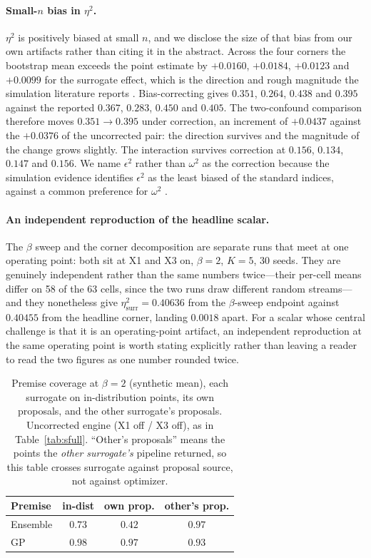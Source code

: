 \documentclass[letterpaper]{article}
\theoremstyle{plain}
\begin{document}
\paragraph{Small-$n$ bias in $\eta^2$.} $\eta^2$ is positively biased at small $n$, and we disclose the size of that bias from our own artifacts rather than citing it in the abstract. Across the four corners the bootstrap mean exceeds the point estimate by $+0.0160$, $+0.0184$, $+0.0123$ and $+0.0099$ for the surrogate effect, which is the direction and rough magnitude the simulation literature reports \citep{okada2013epsilon}. Bias-correcting gives $0.351$, $0.264$, $0.438$ and $0.395$ against the reported $0.367$, $0.283$, $0.450$ and $0.405$. The two-confound comparison therefore moves $0.351\to0.395$ under correction, an increment of $+0.0437$ against the $+0.0376$ of the uncorrected pair: the direction survives and the magnitude of the change grows slightly. The interaction survives correction at $0.156$, $0.134$, $0.147$ and $0.156$. We name $\epsilon^2$ rather than $\omega^2$ as the correction because the simulation evidence identifies $\epsilon^2$ as the least biased of the standard indices, against a common preference for $\omega^2$ \citep{okada2013epsilon}.

\paragraph{An independent reproduction of the headline scalar.} The $\beta$ sweep and the corner decomposition are separate runs that meet at one operating point: both sit at X1 and X3 on, $\beta{=}2$, $K{=}5$, 30 seeds. They are genuinely independent rather than the same numbers twice---their per-cell means differ on 58 of the 63 cells, since the two runs draw different random streams---and they nonetheless give $\eta^2_{\text{surr}}=0.40636$ from the $\beta$-sweep endpoint against $0.40455$ from the headline corner, landing $0.0018$ apart. For a scalar whose central challenge is that it is an operating-point artifact, an independent reproduction at the same operating point is worth stating explicitly rather than leaving a reader to read the two figures as one number rounded twice.

\begin{table}[t]\centering
\caption{Premise coverage at $\beta{=}2$ (synthetic mean), each surrogate on in-distribution points, its own proposals, and the other surrogate's proposals. Uncorrected engine (X1 off / X3 off), as in Table~\ref{tab:sfull}. ``Other's proposals'' means the points the \emph{other surrogate's} pipeline returned, so this table crosses surrogate against proposal source, not against optimizer.}
\label{tab:cross}
\small
\begin{tabular}{lccc}
\toprule
Premise & in-dist & own prop. & other's prop. \\
\midrule
Ensemble & $0.73$ & $0.42$ & $0.97$ \\
GP       & $0.98$ & $0.97$ & $0.93$ \\
\bottomrule
\end{tabular}
\end{table}
\end{document}
